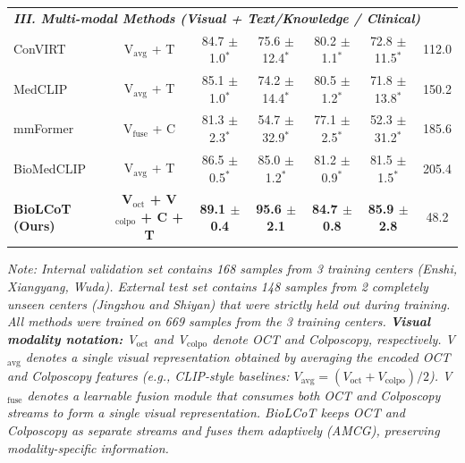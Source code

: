 \begin{table}[t]
{\begin{tabular}{l|c|cc|cc|c}
      \midrule
      \multicolumn{7}{l}{\textit{\textbf{III. Multi-modal Methods (Visual + Text/Knowledge / Clinical)}}} \\
      ConVIRT  & V$_{\text{avg}}$ + T & 84.7 $\pm$ 1.0$^*$ & 75.6 $\pm$ 12.4$^*$ & 80.2 $\pm$ 1.1$^*$ & 72.8 $\pm$ 11.5$^*$ & 112.0 \\
      MedCLIP  & V$_{\text{avg}}$ + T & 85.1 $\pm$ 1.0$^*$ & 74.2 $\pm$ 14.4$^*$ & 80.5 $\pm$ 1.2$^*$ & 71.8 $\pm$ 13.8$^*$ & 150.2 \\
      mmFormer & V$_{\text{fuse}}$ + C & 81.3 $\pm$ 2.3$^*$ & 54.7 $\pm$ 32.9$^*$ & 77.1 $\pm$ 2.5$^*$ & 52.3 $\pm$ 31.2$^*$ & 185.6 \\
      BioMedCLIP  & V$_{\text{avg}}$ + T & 86.5 $\pm$ 0.5$^*$ & 85.0 $\pm$ 1.2$^*$ & 81.2 $\pm$ 0.9$^*$ & 81.5 $\pm$ 1.5$^*$ & 205.4 \\
      \midrule
      \rowcolor{gray!10} \textbf{BioLCoT (Ours)} & \textbf{V$_{\text{oct}}$ + V$_{\text{colpo}}$ + C + T} & \textbf{89.1 $\pm$ 0.4} & \textbf{95.6 $\pm$ 2.1} & \textbf{84.7 $\pm$ 0.8} & \textbf{85.9 $\pm$ 2.8} & 48.2 \\
      \bottomrule
    \end{tabular}%
  }
  \vspace{-0.2cm}
  \begin{flushleft}
  \footnotesize
  \textit{Note: Internal validation set contains 168 samples from 3 training centers (Enshi, Xiangyang, Wuda). External test set contains 148 samples from 2 completely unseen centers (Jingzhou and Shiyan) that were strictly held out during training. All methods were trained on 669 samples from the 3 training centers. \textbf{Visual modality notation:} V$_{\text{oct}}$ and V$_{\text{colpo}}$ denote OCT and Colposcopy, respectively. V$_{\text{avg}}$ denotes a single visual representation obtained by averaging the encoded OCT and Colposcopy features (e.g., CLIP-style baselines: $V_{\text{avg}}=(V_{\text{oct}}+V_{\text{colpo}})/2$). V$_{\text{fuse}}$ denotes a learnable fusion module that consumes both OCT and Colposcopy streams to form a single visual representation. BioLCoT keeps OCT and Colposcopy as separate streams and fuses them adaptively (AMCG), preserving modality-specific information.}
  \end{flushleft}
\end{table}

